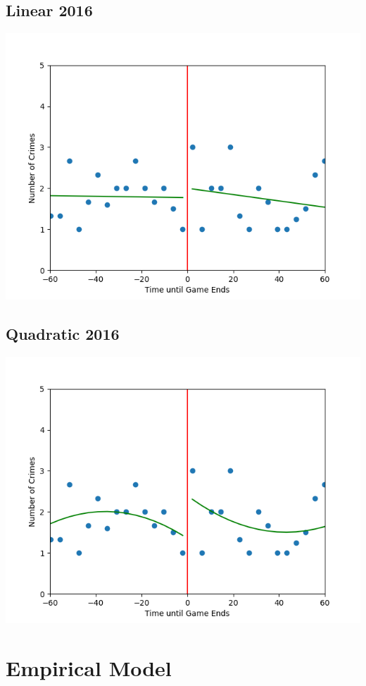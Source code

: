 \documentclass{article}
\begin{document}
\subsection*{Linear 2016}
\includegraphics[scale = .65]{Linear2016}

\subsection*{Quadratic 2016}
\includegraphics[scale = .65]{quad2016}
\newpage{}



\section*{Empirical Model}
\end{document}
